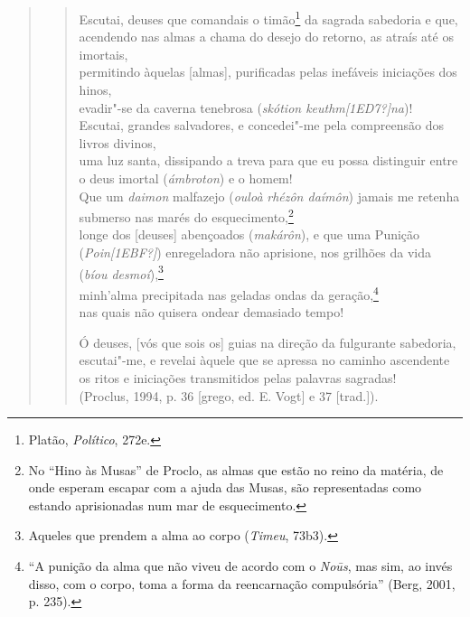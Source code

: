 \begin{quote}\begin{verse}
Escutai, deuses que comandais o timão\footnote{ Platão,
\emph{Político}, 272e.} da sagrada sabedoria e que,\\ 
acendendo nas almas a chama do desejo do retorno, as atraís até
os imortais, \\
permitindo àquelas [almas], purificadas pelas inefáveis
iniciações dos hinos, \\
evadir"-se da caverna tenebrosa (\emph{skótion
keuthm[1ED7?]na})!\\
Escutai, grandes salvadores, e concedei"-me pela compreensão dos
livros divinos,\\
uma luz santa, dissipando a treva para que eu possa distinguir
entre o deus imortal (\emph{ámbroton}) e o homem!\\
Que um \emph{daimon} malfazejo (\emph{ouloà} \emph{rhézôn
daímôn}) jamais me retenha submerso nas marés do
esquecimento,\footnote{ No “Hino às Musas” de Proclo, as almas
que estão no reino da matéria, de onde esperam escapar com a
ajuda das Musas, são representadas como estando aprisionadas num
mar de esquecimento.}\\
longe dos [deuses] abençoados (\emph{makárôn}), e que uma
Punição (\emph{Poin[1EBF?]}) enregeladora não aprisione, nos
grilhões da vida (\emph{bíou desmoí}),\footnote{ Aqueles que
prendem a alma ao corpo (\emph{Timeu}, 73b3).} \\
minh'alma precipitada nas geladas ondas da geração,\footnote{ “A
punição da alma que não viveu de acordo com o \emph{Noūs}, mas
sim, ao invés disso, com o corpo, toma a forma da reencarnação
compulsória” (Berg, 2001, p. 235).} \\
nas quais não quisera ondear demasiado tempo!

Ó deuses, [vós que sois os] guias na direção da fulgurante
sabedoria,\\
escutai"-me, e revelai àquele que se apressa no caminho ascendente\\
os ritos e iniciações transmitidos pelas palavras sagradas! \\
(Proclus, 1994, p. 36 [grego, ed. E. Vogt] e 37 [trad.]).
\end{verse}\end{quote}

